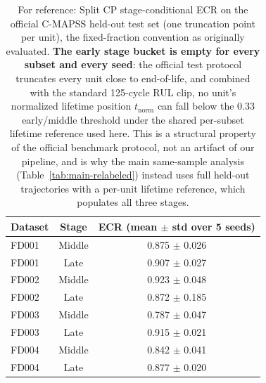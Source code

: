 \begin{table}[t]
\caption{For reference: Split CP stage-conditional ECR on the official C-MAPSS held-out test set (one truncation point per unit), the fixed-fraction convention as originally evaluated. \textbf{The early stage bucket is empty for every subset and every seed}: the official test protocol truncates every unit close to end-of-life, and combined with the standard 125-cycle RUL clip, no unit's normalized lifetime position $t_{\mathrm{norm}}$ can fall below the 0.33 early/middle threshold under the shared per-subset lifetime reference used here. This is a structural property of the official benchmark protocol, not an artifact of our pipeline, and is why the main same-sample analysis (Table~\ref{tab:main-relabeled}) instead uses full held-out trajectories with a per-unit lifetime reference, which populates all three stages.}
\label{tab:official-test}
\centering
\begin{tabular}{lcc}
\toprule
Dataset & Stage & ECR (mean $\pm$ std over 5 seeds) \\
\midrule
FD001 & Middle & 0.875 $\pm$ 0.026 \\
FD001 & Late & 0.907 $\pm$ 0.027 \\
FD002 & Middle & 0.923 $\pm$ 0.048 \\
FD002 & Late & 0.872 $\pm$ 0.185 \\
FD003 & Middle & 0.787 $\pm$ 0.047 \\
FD003 & Late & 0.915 $\pm$ 0.021 \\
FD004 & Middle & 0.842 $\pm$ 0.041 \\
FD004 & Late & 0.877 $\pm$ 0.020 \\
\bottomrule
\end{tabular}
\end{table}
